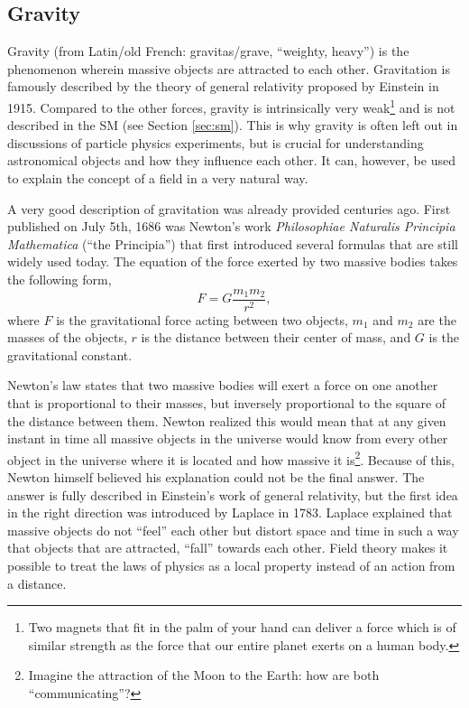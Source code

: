 \subsection{Gravity}
Gravity (from Latin/old French: gravitas/grave, ``weighty, heavy'') is the phenomenon wherein massive objects are attracted to each other. Gravitation is famously described by the theory of general relativity proposed by Einstein in 1915. Compared to the other forces, gravity is intrinsically very weak\footnote{Two magnets that fit in the palm of your hand can deliver a force which is of similar strength as the force that our entire planet exerts on a human body.} and is not described in the SM (see Section \ref{sec:sm}). This is why gravity is often left out in discussions of particle physics experiments, but is crucial for understanding astronomical objects and how they influence each other. It can, however, be used to explain the concept of a field in a very natural way.

A very good description of gravitation was already provided centuries ago. First published on July 5th, 1686 was Newton's work \textit{Philosophiae Naturalis Principia Mathematica} (``the Principia'') that first introduced several formulas that are still widely used today. The equation of the force exerted by two massive bodies takes the following form,
\begin{equation}
F = G \frac{m_1 m_2}{r^2},
\end{equation}
where $F$ is the gravitational force acting between two objects, $m_1$ and $m_2$ are the masses of the objects, $r$ is the distance between their center of mass, and $G$ is the gravitational constant.

Newton's law states that two massive bodies will exert a force on one another that is proportional to their masses, but inversely proportional to the square of the distance between them. Newton realized this would mean that at any given instant in time all massive objects in the universe would know from every other object in the universe where it is located and how massive it is\footnote{Imagine the attraction of the Moon to the Earth: how are both ``communicating''?}. Because of this, Newton himself believed his explanation could not be the final answer. The answer is fully described in Einstein's work of general relativity, but the first idea in the right direction was introduced by Laplace in 1783. Laplace explained that massive objects do not ``feel'' each other but distort space and time in such a way that objects that are attracted, ``fall'' towards each other. Field theory makes it possible to treat the laws of physics as a local property instead of an action from a distance.



